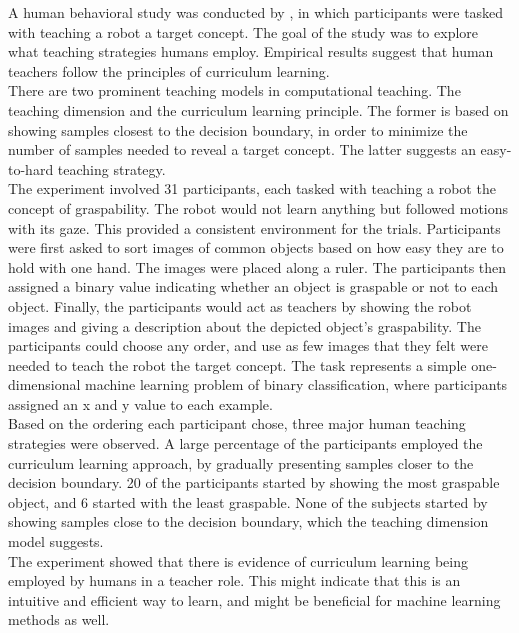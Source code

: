 


A human behavioral study was conducted by \citep{Khan_human_teach}, in which participants were tasked with teaching a robot a target concept. The goal of the study was to explore what teaching strategies humans employ. Empirical results suggest that human teachers follow the principles of curriculum learning. \\

There are two prominent teaching models in computational teaching. The teaching dimension and the curriculum  learning principle. The former is based on showing samples closest to the decision boundary, in order to minimize the number of samples needed to reveal a target concept. The latter suggests an easy-to-hard teaching strategy. \\

The experiment involved 31 participants, each tasked with teaching a robot the concept of graspability. The robot would not learn anything but followed motions with its gaze. This provided a consistent environment for the trials. Participants were first asked to sort images of common objects based on how easy they are to hold with one hand. The images were placed along a ruler.  The participants then assigned a binary value indicating whether an object is graspable or not to each object. Finally, the participants would act as teachers by showing the robot images and giving a description about the depicted object's graspability. The participants could choose any order, and use as few images that they felt were needed to teach the robot the target concept. The task represents a simple one-dimensional machine learning problem of binary classification, where participants assigned an x and y value to each example. \\

Based on the ordering each participant chose, three major human teaching strategies were observed. A large percentage of the participants employed the curriculum learning approach, by gradually presenting samples closer to the decision boundary. 20 of the participants started by showing the most graspable object, and 6 started with the least graspable.  None of the subjects started by showing samples close to the decision boundary, which the teaching dimension model suggests.\\

The experiment showed that there is evidence of curriculum learning being employed by humans in a teacher role. This might indicate that this is an intuitive and efficient way to learn, and might be beneficial for machine learning methods as well. \\
